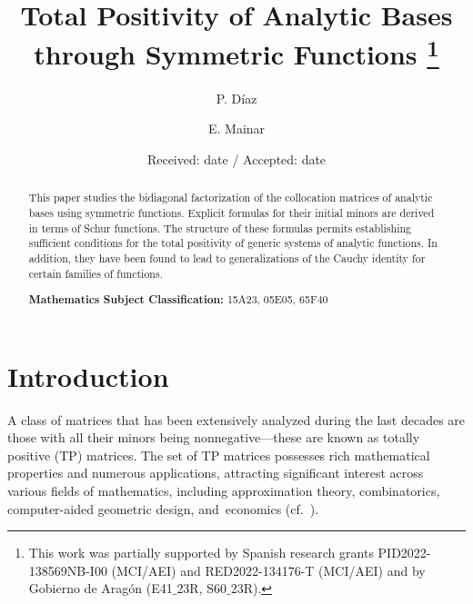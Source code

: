 \documentclass[smallextended]{svjour3}       %
\begin{document}
\title{Total Positivity of Analytic Bases through Symmetric Functions
\protect\thanks{This work was partially supported by Spanish research grants PID2022-138569NB-I00 (MCI/AEI) and RED2022-134176-T (MCI/AEI) and by Gobierno de Aragón (E41$\_$23R, S60$\_$23R).}}

\subtitle{}

\author{P. D\'iaz \and E. Mainar}



             
             




\date{Received: date / Accepted: date}



\maketitle

\begin{abstract} 
  This paper studies the bidiagonal factorization of the collocation matrices of analytic bases using symmetric functions. Explicit formulas for their initial minors are derived in terms of Schur functions. The structure of these formulas permits establishing sufficient conditions for the total positivity of generic systems of analytic functions. In addition, they have been found to lead to generalizations of the Cauchy identity for certain families of functions.




\textbf{Mathematics Subject Classification:}  15A23, 05E05,  65F40
\end{abstract}

\section{Introduction}
A class of matrices that has been extensively analyzed during the last decades are those with all their minors being nonnegative---these are known as totally positive (TP) matrices. The set of TP matrices possesses rich mathematical properties and numerous applications, attracting significant interest across various fields of mathematics, including approximation theory, combinatorics, computer-aided geometric design, and~economics (cf.~\cite{Ando,FJ11,Gasca1,Gasca2,Gasca3}).
\end{document}
